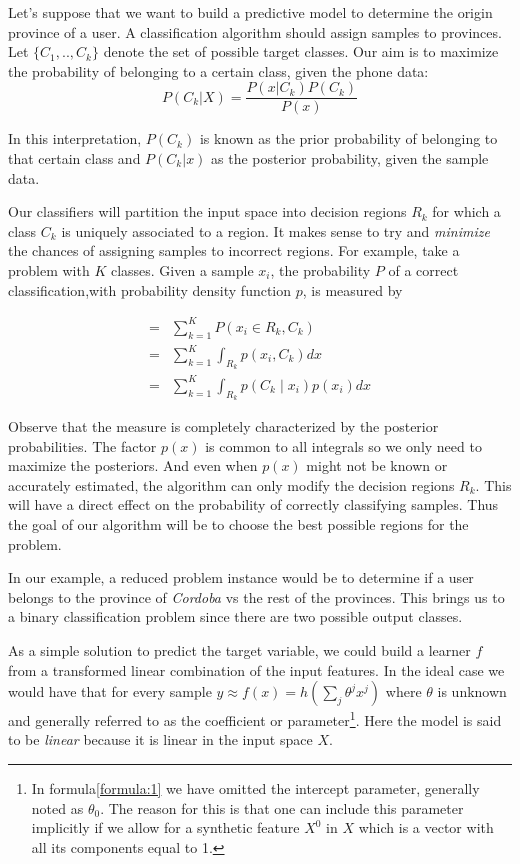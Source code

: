 Let's suppose that we want to build a predictive model to determine the origin province of a user. A classification algorithm should assign samples to provinces. Let $\{C_1,..,C_k\}$ denote the set of possible target classes. Our aim is to maximize the probability of belonging to a certain class, given the phone data:
\begin{equation}
P(C_k| X) = \frac{P(x|C_k)P(C_k)}{P(x)}
\end{equation}

In this interpretation, $P(C_k)$ is known as the prior probability of belonging to that certain class and $P(C_k|x)$ as the posterior probability, given the sample data.

Our classifiers will partition the input space into decision regions $R_k$ for which a class $C_k$ is uniquely associated to a region. It makes sense to try and \textit{minimize} the chances of assigning samples to incorrect regions. For example, take a problem with $K$ classes. Given a sample $x_i$, the probability $P$ of a correct classification,with probability density function $p$, is measured by

\begin{equation}\label{eq:goodclassification-equation}
\begin{split}
= & \sum_{k=1}^{K} P(x_i \in R_k, C_k ) \\
= & \sum_{k=1}^{K} \int_{R_k}p(x_i,C_k) dx \\
= & \sum_{k=1}^{K} \int_{R_k}p(C_k \mid x_i) p(x_i) dx
\end{split}
\end{equation}

Observe that the measure is completely characterized by the posterior probabilities. The factor $p(x)$ is common to all integrals so we only need to maximize the posteriors. And even when $p(x)$ might not be known or accurately estimated, the algorithm can only modify the decision regions $R_k$. This will have a direct effect on the probability of correctly classifying samples. Thus the goal of our algorithm will be to choose the best possible regions for the problem.

In our example, a reduced problem instance would be to determine if a user belongs to the province of \textit{Cordoba} vs the rest of the provinces. This brings us to a binary classification problem since there are two possible output classes. %

As a simple solution to predict the target variable, we could build a learner $f$ from a transformed linear combination of the input features. In the ideal case we would have that for every sample $y \approx f(x) = h\left(\sum_{j}\theta^j x^j\right)$\label{formula:1} where $\theta$ is unknown and generally referred to as the coefficient or parameter\footnote{In formula\cref{formula:1} we have omitted the intercept parameter, generally noted as $\theta_0$. The reason for this is that one can include this parameter implicitly if we allow for a synthetic feature $X^0$ in $X$ which is a vector with all its components equal to 1.}. Here the model is said to be \textit{linear} because it is linear in the input space $X$.

